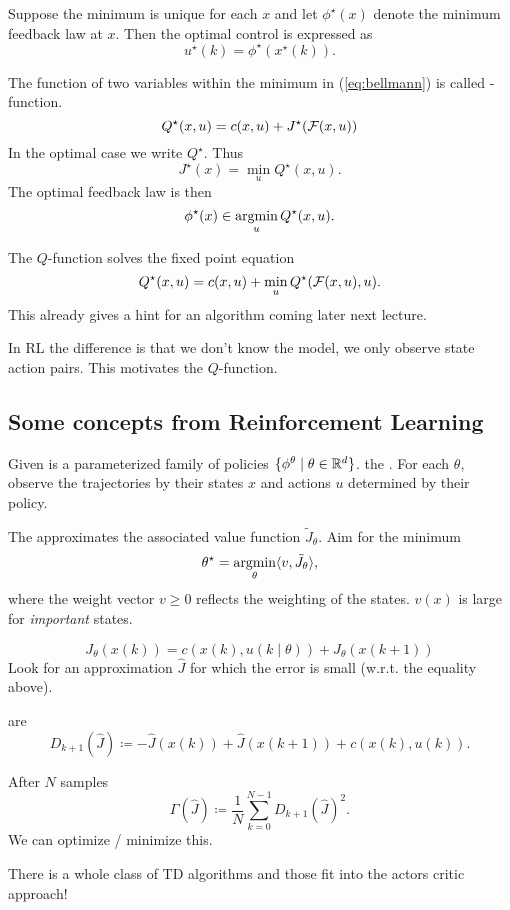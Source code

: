 Suppose the minimum is unique for each \(x\) and let \(\phi^\star(x)\) denote 
the minimum feedback law at \(x\). Then the optimal control is expressed as 
\[u^\star(k)=\phi^\star(x^\star(k)).\]

\begin{definition}[Q-function]\label{def:1.14}
    The function of two variables within the minimum in (\ref{eq:bellmann}) is called -function.
    \[Q^\star(x,u)=c(x,u)+J^\star(\mathcal{F}(x,u))\]
    In the optimal case we write \(Q^\star\). Thus 
    \[J^\star(x)=\min_{u}Q^\star(x,u).\] 
    The optimal feedback law is then 
    \[\phi^\star(x)\in\operatorname*{\text{argmin}}_{u}Q^\star(x,u).\]    
\end{definition} %

The \(Q\)-function solves the fixed point equation 
\[Q^\star(x,u)=c(x,u)+\min_{u}Q^\star(\mathcal{F}(x,u),u).\]
This already gives a hint for an algorithm coming later next lecture.

\begin{remark}
    In RL the difference is that we don't know the model, we only observe state action pairs.
    This motivates the \(Q\)-function.        
\end{remark}

\subsection*{Some concepts from Reinforcement Learning}


Given is a parameterized family of policies \(\{\phi^\theta\mid \theta\in \mathbb{R}^d\}\).
the . For each \(\theta\), observe the trajectories by their states 
\(x\) and actions \(u\) determined by their policy.

The  approximates the associated value function 
\(\tilde{J}_\theta\). Aim for the minimum 
\[\theta^\star=\operatorname*{\text{argmin}}_{\theta}\langle v, \tilde{J}_\theta \rangle,\]
where the weight vector \(v\geq 0\) reflects the weighting of the states. \(v(x)\) is large for \textit{important} states.


\[J_\theta(x(k))=c(x(k),u(k\mid\theta))+J_\theta(x(k+1))\]
Look for an approximation \(\hat{J}\) for which the error is small (w.r.t. the equality above).

 are 
\[D_{k+1}(\hat{J})\coloneqq -\hat{J}(x(k))+\hat{J}(x(k+1))+c(x(k),u(k)).\]

After \(N\) samples 
\[\Gamma(\hat{J})\coloneqq \frac{1}{N}\sum_{k=0}^{N-1} D_{k+1}(\hat{J})^2.\]
We can optimize / minimize this.

There is a whole class of TD algorithms and those fit into the actors critic approach!


